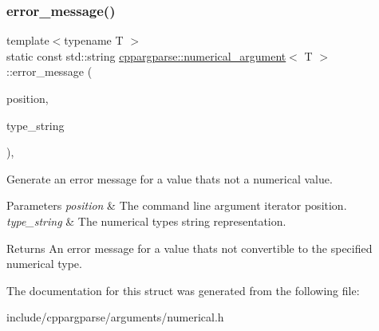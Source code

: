 \subsubsection{\texorpdfstring{error\+\_\+message()}{error\_message()}}
{\footnotesize\ttfamily template$<$typename T $>$ \\
static const std\+::string \hyperlink{structcppargparse_1_1numerical__argument}{cppargparse\+::numerical\+\_\+argument}$<$ T $>$\+::error\+\_\+message (\begin{DoxyParamCaption}\item[{const \hyperlink{types_8h_a43b4f43f8940de1bf09ced6f1b668053}{types\+::\+Command\+Line\+Position\+\_\+t} \&}]{position,  }\item[{const std\+::string \&}]{type\+\_\+string }\end{DoxyParamCaption})\hspace{0.3cm}{\ttfamily [inline]}, {\ttfamily [static]}}



Generate an error message for a value that\textquotesingle{}s not a numerical value. 


\begin{DoxyParams}{Parameters}
{\em position} & The command line argument iterator position. \\
\hline
{\em type\+\_\+string} & The numerical type\textquotesingle{}s string representation.\\
\hline
\end{DoxyParams}
\begin{DoxyReturn}{Returns}
An error message for a value that\textquotesingle{}s not convertible to the specified numerical type. 
\end{DoxyReturn}


The documentation for this struct was generated from the following file\+:\begin{DoxyCompactItemize}
\item 
include/cppargparse/arguments/numerical.\+h\end{DoxyCompactItemize}
